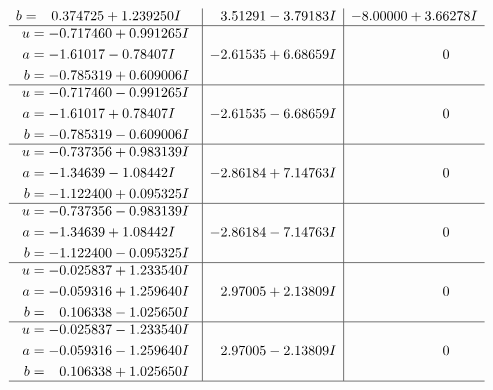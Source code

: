 \documentclass[1p]{elsarticle_modified}
\theoremstyle{definition}
\begin{document}
$$\begin{array}{c|c|c}
\begin{aligned}
b &= \phantom{-}0.374725 + 1.239250 I\end{aligned}
 & \phantom{-}3.51291 - 3.79183 I & -8.00000 + 3.66278 I \\ \hline\begin{aligned}
u &= -0.717460 + 0.991265 I \\
a &= -1.61017 - 0.78407 I \\
b &= -0.785319 + 0.609006 I\end{aligned}
 & -2.61535 + 6.68659 I & \phantom{-0.000000 } 0 \\ \hline\begin{aligned}
u &= -0.717460 - 0.991265 I \\
a &= -1.61017 + 0.78407 I \\
b &= -0.785319 - 0.609006 I\end{aligned}
 & -2.61535 - 6.68659 I & \phantom{-0.000000 } 0 \\ \hline\begin{aligned}
u &= -0.737356 + 0.983139 I \\
a &= -1.34639 - 1.08442 I \\
b &= -1.122400 + 0.095325 I\end{aligned}
 & -2.86184 + 7.14763 I & \phantom{-0.000000 } 0 \\ \hline\begin{aligned}
u &= -0.737356 - 0.983139 I \\
a &= -1.34639 + 1.08442 I \\
b &= -1.122400 - 0.095325 I\end{aligned}
 & -2.86184 - 7.14763 I & \phantom{-0.000000 } 0 \\ \hline\begin{aligned}
u &= -0.025837 + 1.233540 I \\
a &= -0.059316 + 1.259640 I \\
b &= \phantom{-}0.106338 - 1.025650 I\end{aligned}
 & \phantom{-}2.97005 + 2.13809 I & \phantom{-0.000000 } 0 \\ \hline\begin{aligned}
u &= -0.025837 - 1.233540 I \\
a &= -0.059316 - 1.259640 I \\
b &= \phantom{-}0.106338 + 1.025650 I\end{aligned}
 & \phantom{-}2.97005 - 2.13809 I & \phantom{-0.000000 } 0\\
 \hline 
 \end{array}$$\newpage$$\begin{array}{c|c|c}  

\end{array}$$
\end{document}
